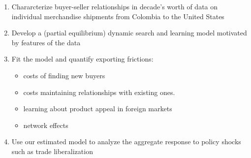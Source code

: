 \documentclass[notes=show]{beamer}
\begin{document}
\begin{frame}%


\begin{enumerate}
\item Chararcterize buyer-seller relationships in decade's worth of data on
individual merchandise shipments from Colombia to the United States

\item Develop a (partial equilibrium) dynamic search and learning model motivated by features of the data 

\item Fit the model and quantify exporting frictions:

\begin{itemize}
\item costs of finding new buyers

\item costs maintaining relationships with existing ones.

\item learning about product appeal in foreign markets

\item network effects
\end{itemize}

\item Use our estimated model to analyze the aggregate response to policy shocks such as trade liberalization
\end{enumerate}

\end{frame}%
\end{document}
